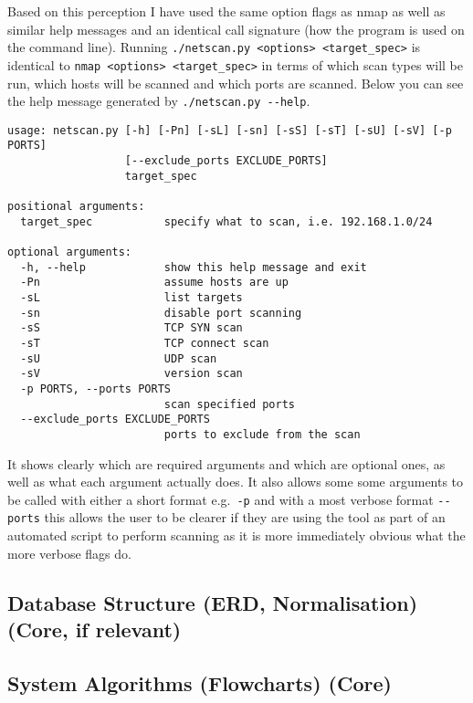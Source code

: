 \documentclass[titlepage]{article}
\begin{document}
Based on this perception I have used the same option flags as nmap as well as similar help messages
and an identical call signature (how the program is used on the command line). Running 
\verb|./netscan.py <options> <target_spec>| is identical to \verb|nmap <options> <target_spec>| in terms
of which scan types will be run, which hosts will be scanned and which ports are scanned. Below you can see
the help message generated by \verb|./netscan.py --help|.
\begin{lstlisting}
usage: netscan.py [-h] [-Pn] [-sL] [-sn] [-sS] [-sT] [-sU] [-sV] [-p PORTS]
                  [--exclude_ports EXCLUDE_PORTS]
                  target_spec

positional arguments:
  target_spec           specify what to scan, i.e. 192.168.1.0/24

optional arguments:
  -h, --help            show this help message and exit
  -Pn                   assume hosts are up
  -sL                   list targets
  -sn                   disable port scanning
  -sS                   TCP SYN scan
  -sT                   TCP connect scan
  -sU                   UDP scan
  -sV                   version scan
  -p PORTS, --ports PORTS
                        scan specified ports
  --exclude_ports EXCLUDE_PORTS
                        ports to exclude from the scan
\end{lstlisting}

It shows clearly which are required arguments and which are optional ones, as well as what
each argument actually does. It also allows some some arguments to be called with either
a short format e.g.\ \verb|-p| and with a most verbose format \verb|--ports| this allows
the user to be clearer if they are using the tool as part of an automated script to perform
scanning as it is more immediately obvious what the more verbose flags do.

\subsection{Database Structure (ERD, Normalisation) (Core, if relevant)}

\textbf{\color{red}{I am fairly sure this is irrelevant to mine?}}

\subsection{System Algorithms (Flowcharts) (Core)}

\textbf{\color{Emerald}{When I have finished the first draft of the text bits I will add pictures / flowcharts}}
\end{document}
